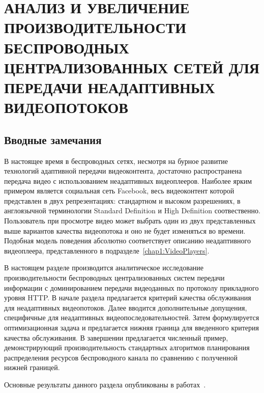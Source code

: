 \chapter{АНАЛИЗ И УВЕЛИЧЕНИЕ ПРОИЗВОДИТЕЛЬНОСТИ БЕСПРОВОДНЫХ ЦЕНТРАЛИЗОВАННЫХ СЕТЕЙ ДЛЯ ПЕРЕДАЧИ НЕАДАПТИВНЫХ ВИДЕОПОТОКОВ}
\label{chap3}

\section{Вводные замечания}
\label{chap3:Intro}
В настоящее время в беспроводных сетях, несмотря на бурное развитие технологий адаптивной передачи видеоконтента, достаточно распространена передача видео с использованием неадаптивных видеоплееров. Наиболее ярким примером является социальная сеть Facebook, весь видеоконтент которой представлен в двух репрезентациях: стандартном и высоком разрешениях, в англоязычной терминологии Standard Definition и High Definition соотвественно. Пользователь при просмотре видео может выбрать один из двух представленных выше вариантов качества видеопотока и оно не будет изменяться во времени. Подобная модель поведения абсолютно соответствует описанию неадаптивного видеоплеера, представленного в подразделе~\ref{chap1:VideoPlayers}.

В настоящем разделе производится аналитическое исследование производительности беспроводных централизованных систем передачи информации с доминированием передачи видеоданных по протоколу прикладного уровня HTTP. В начале раздела предлагается критерий качества обслуживания для неадаптивных видеопотоков. Далее вводится дополнительные допущения, специфичные для неадаптивных видеопоследовательностей. Затем формулируется оптимизационная задача и предлагается нижняя граница для введенного критерия качества обслуживания. В завершении предлагается численный пример, демонстрирующий производительность стандартных алгоритмов планирования распределения ресурсов беспроводного канала по сравнению с полученной нижней границей.

Основные результаты данного раздела опубликованы в работах~\cite{past_tur,Suai2017}.


